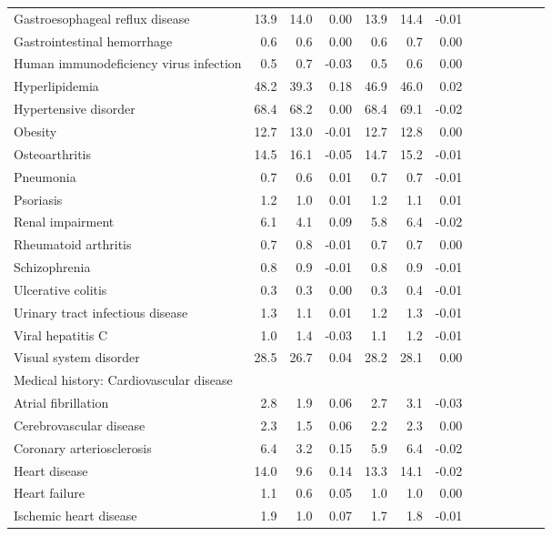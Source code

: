 \documentclass[11pt,]{article}
\begin{document}
\begin{longtable}{lrrrrrrrrrrrr}
      Gastroesophageal reflux disease & 13.9 & 14.0 &  0.00 & 13.9 & 14.4 & -0.01 \\ 
      Gastrointestinal hemorrhage &  0.6 &  0.6 &  0.00 &  0.6 &  0.7 &  0.00 \\ 
      Human immunodeficiency virus infection &  0.5 &  0.7 & -0.03 &  0.5 &  0.6 &  0.00 \\ 
      Hyperlipidemia & 48.2 & 39.3 &  0.18 & 46.9 & 46.0 &  0.02 \\ 
      Hypertensive disorder & 68.4 & 68.2 &  0.00 & 68.4 & 69.1 & -0.02 \\ 
      Obesity & 12.7 & 13.0 & -0.01 & 12.7 & 12.8 &  0.00 \\ 
      Osteoarthritis & 14.5 & 16.1 & -0.05 & 14.7 & 15.2 & -0.01 \\ 
      Pneumonia &  0.7 &  0.6 &  0.01 &  0.7 &  0.7 & -0.01 \\ 
      Psoriasis &  1.2 &  1.0 &  0.01 &  1.2 &  1.1 &  0.01 \\ 
      Renal impairment &  6.1 &  4.1 &  0.09 &  5.8 &  6.4 & -0.02 \\ 
      Rheumatoid arthritis &  0.7 &  0.8 & -0.01 &  0.7 &  0.7 &  0.00 \\ 
      Schizophrenia &  0.8 &  0.9 & -0.01 &  0.8 &  0.9 & -0.01 \\ 
      Ulcerative colitis &  0.3 &  0.3 &  0.00 &  0.3 &  0.4 & -0.01 \\ 
      Urinary tract infectious disease &  1.3 &  1.1 &  0.01 &  1.2 &  1.3 & -0.01 \\ 
      Viral hepatitis C &  1.0 &  1.4 & -0.03 &  1.1 &  1.2 & -0.01 \\ 
      Visual system disorder & 28.5 & 26.7 &  0.04 & 28.2 & 28.1 &  0.00 \\ 
  Medical history: Cardiovascular disease &    &    &     &    &    &     \\ 
      Atrial fibrillation &  2.8 &  1.9 &  0.06 &  2.7 &  3.1 & -0.03 \\ 
      Cerebrovascular disease &  2.3 &  1.5 &  0.06 &  2.2 &  2.3 &  0.00 \\ 
      Coronary arteriosclerosis &  6.4 &  3.2 &  0.15 &  5.9 &  6.4 & -0.02 \\ 
      Heart disease & 14.0 &  9.6 &  0.14 & 13.3 & 14.1 & -0.02 \\ 
      Heart failure &  1.1 &  0.6 &  0.05 &  1.0 &  1.0 &  0.00 \\ 
      Ischemic heart disease &  1.9 &  1.0 &  0.07 &  1.7 &  1.8 & -0.01 \\ 

\end{longtable}
\end{document}
